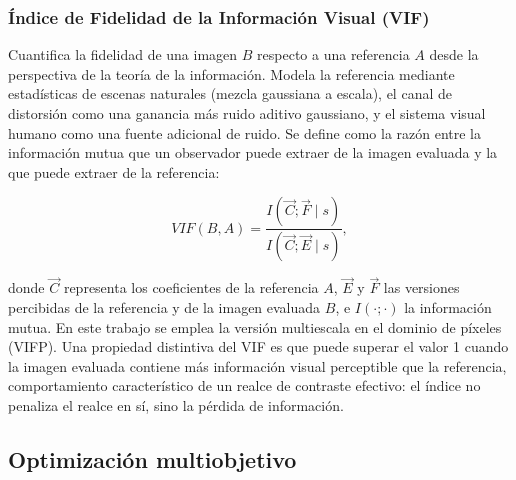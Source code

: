 \documentclass[sigplan,screen]{acmart}
\begin{document}
\subsubsection{Índice de Fidelidad de la Información Visual (VIF) \cite{Sheikh2006}}
Cuantifica la fidelidad de una imagen $B$ respecto a una referencia $A$ desde la perspectiva de la teoría de la información. Modela la referencia mediante estadísticas de escenas naturales (mezcla gaussiana a escala), el canal de distorsión como una ganancia más ruido aditivo gaussiano, y el sistema visual humano como una fuente adicional de ruido. Se define como la razón entre la información mutua que un observador puede extraer de la imagen evaluada y la que puede extraer de la referencia:

\begin{equation}
   VIF(B,A)=\frac{I(\vec{C};\vec{F}\mid s)}{I(\vec{C};\vec{E}\mid s)},
\label{eq:eqvif}
\end{equation}

\noindent donde $\vec{C}$ representa los coeficientes de la referencia $A$, $\vec{E}$ y $\vec{F}$ las versiones percibidas de la referencia y de la imagen evaluada $B$, e $I(\cdot;\cdot)$ la información mutua. En este trabajo se emplea la versión multiescala en el dominio de píxeles (VIFP). Una propiedad distintiva del VIF es que puede superar el valor 1 cuando la imagen evaluada contiene más información visual perceptible que la referencia, comportamiento característico de un realce de contraste efectivo: el índice no penaliza el realce en sí, sino la pérdida de información.

\subsection{Optimización multiobjetivo}
\end{document}
